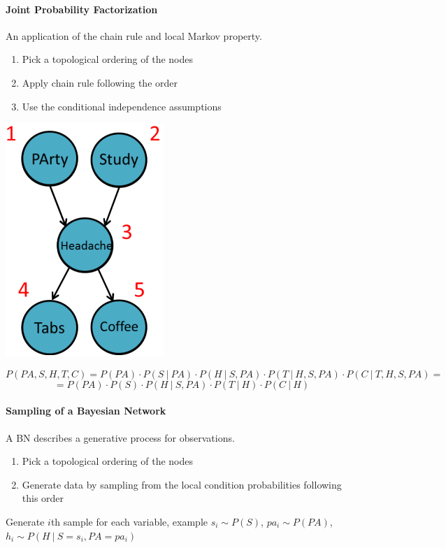\documentclass[10pt]{report}
\begin{document}
\paragraph{Joint Probability Factorization}
\begin{multicols}{2}
An application of the chain rule and local Markov property.\begin{enumerate}
	\item Pick a topological ordering of the nodes
	\item Apply chain rule following the order
	\item Use the conditional independence assumptions
\end{enumerate}
\columnbreak
\begin{center}
	\includegraphics[scale=0.5]{209.png}
\end{center}
\end{multicols}
$$P(PA,S,H,T,C) = P(PA)\cdot P(S\:|\:PA)\cdot P(H\:|\:S,PA)\cdot P(T\:|\:H,S,PA)\cdot P(C\:|\:T,H,S,PA)=$$
$$=P(PA)\cdot P(S)\cdot P(H\:|\:S,PA)\cdot P(T\:|\:H)\cdot P(C\:|\:H)$$
\paragraph{Sampling of a Bayesian Network} A BN describes a generative process for observations.
\begin{enumerate}
	\item Pick a topological ordering of the nodes
	\item Generate data by sampling from the local condition probabilities following this order
\end{enumerate}
Generate $i$th sample for each variable, example $s_i\sim P(S)$, $pa_i\sim P(PA)$, $h_i\sim P(H\:|\:S=s_i, PA = pa_i)$
\end{document}
